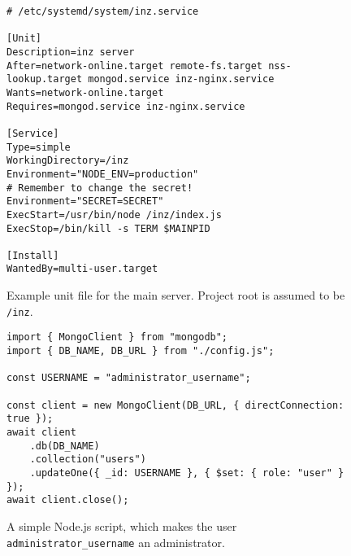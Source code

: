 \begin{figure}
	\centering
	\begin{verbatim}
# /etc/systemd/system/inz.service

[Unit]
Description=inz server
After=network-online.target remote-fs.target nss-lookup.target mongod.service inz-nginx.service
Wants=network-online.target
Requires=mongod.service inz-nginx.service

[Service]
Type=simple
WorkingDirectory=/inz
Environment="NODE_ENV=production"
# Remember to change the secret!
Environment="SECRET=SECRET"
ExecStart=/usr/bin/node /inz/index.js
ExecStop=/bin/kill -s TERM $MAINPID

[Install]
WantedBy=multi-user.target
	\end{verbatim}
	\caption{Example unit file for the main server. Project root is assumed to be \texttt{/inz}.}
	\label{fig:example-server-service}
\end{figure}

\begin{figure}
	\centering
	\begin{verbatim}
import { MongoClient } from "mongodb";
import { DB_NAME, DB_URL } from "./config.js";

const USERNAME = "administrator_username";

const client = new MongoClient(DB_URL, { directConnection: true });
await client
	.db(DB_NAME)
	.collection("users")
	.updateOne({ _id: USERNAME }, { $set: { role: "user" } });
await client.close();
	\end{verbatim}
	\caption{A simple Node.js script, which makes the user \texttt{administrator\_username} an administrator.}
	\label{fig:make-admin-script}
\end{figure}




